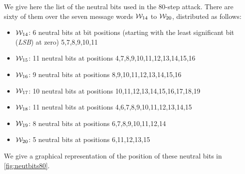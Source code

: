We give here the list of the neutral bits used in the 80-step attack.
There are sixty of them over the seven message words
$\mathcal{W}_{14}$ to $\mathcal{W}_{20}$, distributed as
follows:
\begin{itemize}
\item $\mathcal{W}_{14}$: 6 neutral bits at  bit positions (starting with the least significant bit (\emph{LSB}) at zero) 5,7,8,9,10,11
\item $\mathcal{W}_{15}$: 11 neutral bits at positions 4,7,8,9,10,11,12,13,14,15,16
\item $\mathcal{W}_{16}$: 9 neutral bits at positions 8,9,10,11,12,13,14,15,16
\item $\mathcal{W}_{17}$: 10 neutral bits at positions 10,11,12,13,14,15,16,17,18,19 
\item $\mathcal{W}_{18}$: 11 neutral bits at positions 4,6,7,8,9,10,11,12,13,14,15
\item $\mathcal{W}_{19}$: 8 neutral bits at positions 6,7,8,9,10,11,12,14
\item $\mathcal{W}_{20}$: 5 neutral bits at positions 6,11,12,13,15 
\end{itemize}
We give a graphical representation of the position of these neutral bits in \autoref{fig:neutbits80}.

